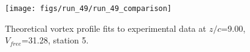 \begin{figure}[H]
\centering
\texttt{[image: figs/run\_49/run\_49\_comparison]}
\caption{Theoretical vortex profile fits to experimental data at $z/c$=9.00, $V_{free}$=31.28, station 5.}
\end{figure}


